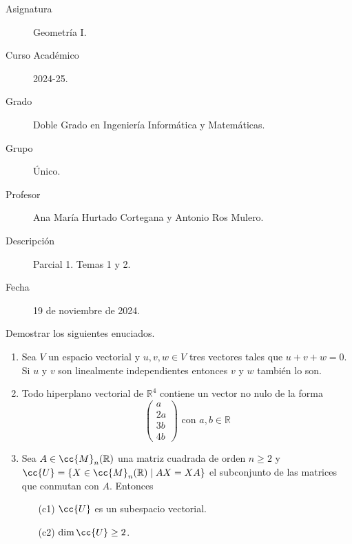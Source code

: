 \documentclass[12pt]{article}
\begin{document}

    
    

    \begin{description}
        \item[Asignatura] Geometría I.
        \item[Curso Académico] 2024-25.
        \item[Grado] Doble Grado en Ingeniería Informática y Matemáticas.
        \item[Grupo] Único.
        \item[Profesor] Ana María Hurtado Cortegana y Antonio Ros Mulero.
        \item[Descripción] Parcial 1. Temas 1 y 2.
        \item[Fecha] 19 de noviembre de 2024.
    
    \end{description}
    \newpage

    \begin{ejercicio}[5 puntos]
        Demostrar los siguientes enuciados.
        \begin{enumerate}[label=\alph*)]
            \item Sea $V$ un espacio vectorial y $u,v,w\in V$ tres vectores tales que $u+v+w=0$. Si $u$ y $v$ son linealmente independientes entonces $v$ y $w$ también lo son.
            \item Todo hiperplano vectorial de $\mathbb{R}^4$ contiene un vector no nulo de la forma
                \begin{equation*}
                    \left(\begin{array}{c}
                        a \\
                        2a \\
                        3b \\
                        4b
                    \end{array}\right) \text{\ con\ } a,b\in \mathbb{R}
                \end{equation*}
            \item Sea $A\in \cc{M}_n(\mathbb{R})$ una matriz cuadrada de orden $n\geq 2$ y $\cc{U}=\{X\in \cc{M}_n(\mathbb{R}) \mid AX = XA\}$ el subconjunto de las matrices que conmutan con $A$. Entonces
                \begin{enumerate}
                    \item[(c1)] $\cc{U}$ es un subespacio vectorial.
                    \item[(c2)] $\dim \cc{U}\geq 2$.
                \end{enumerate}
        \end{enumerate}
    \end{ejercicio}
\end{document}
